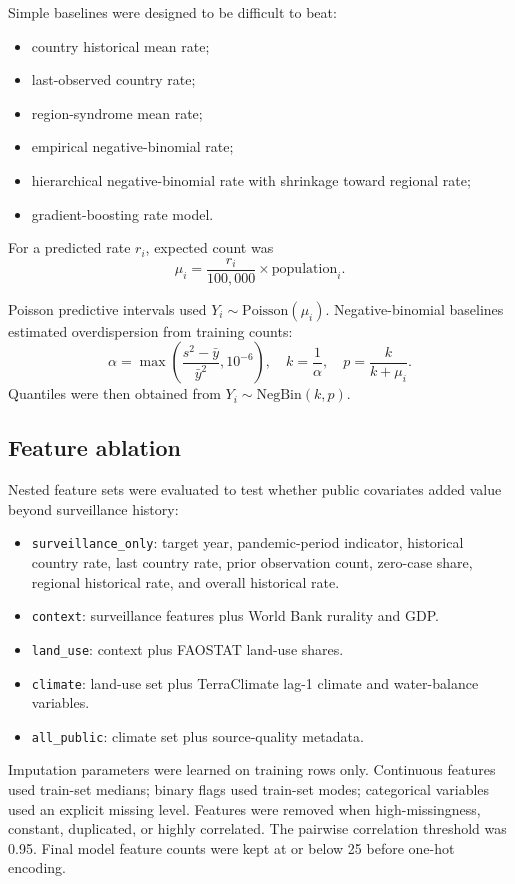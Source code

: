 \documentclass[11pt]{article}
\begin{document}
Simple baselines were designed to be difficult to beat:

\begin{itemize}
  \item country historical mean rate;
  \item last-observed country rate;
  \item region-syndrome mean rate;
  \item empirical negative-binomial rate;
  \item hierarchical negative-binomial rate with shrinkage toward regional rate;
  \item gradient-boosting rate model.
\end{itemize}

For a predicted rate \(r_i\), expected count was
\[
\mu_i = \frac{r_i}{100{,}000} \times \mathrm{population}_i.
\]

Poisson predictive intervals used \(Y_i \sim \mathrm{Poisson}(\mu_i)\). Negative-binomial baselines estimated overdispersion from training counts:
\[
\alpha = \max\left(\frac{s^2 - \bar{y}}{\bar{y}^2}, 10^{-6}\right), \quad
k = \frac{1}{\alpha}, \quad
p = \frac{k}{k+\mu_i}.
\]
Quantiles were then obtained from \(Y_i \sim \mathrm{NegBin}(k,p)\).

\subsection{Feature ablation}

Nested feature sets were evaluated to test whether public covariates added value beyond surveillance history:

\begin{itemize}
  \item \texttt{surveillance\_only}: target year, pandemic-period indicator, historical country rate, last country rate, prior observation count, zero-case share, regional historical rate, and overall historical rate.
  \item \texttt{context}: surveillance features plus World Bank rurality and GDP.
  \item \texttt{land\_use}: context plus FAOSTAT land-use shares.
  \item \texttt{climate}: land-use set plus TerraClimate lag-1 climate and water-balance variables.
  \item \texttt{all\_public}: climate set plus source-quality metadata.
\end{itemize}

Imputation parameters were learned on training rows only. Continuous features used train-set medians; binary flags used train-set modes; categorical variables used an explicit missing level. Features were removed when high-missingness, constant, duplicated, or highly correlated. The pairwise correlation threshold was 0.95. Final model feature counts were kept at or below 25 before one-hot encoding.
\end{document}
